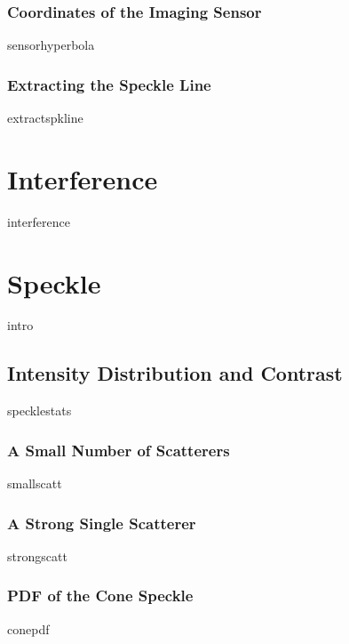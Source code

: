 \documentclass[12pt,a4paper,titlepage,onecolumn]{report}
\begin{document}
\subsection{Coordinates of the Imaging Sensor}
{sensorhyperbola}
\subsection{Extracting the Speckle Line}
{extractspkline}

\chapter{Interference}\label{ch:interference}
{interference}

\chapter{Speckle}\label{ch:speckle}
{intro}
\section{Intensity Distribution and Contrast}
{specklestats}
\subsection{A Small Number of Scatterers}
{smallscatt}
\subsection{A Strong Single Scatterer}
{strongscatt}
\subsection{PDF of the Cone Speckle}
{conepdf}
\end{document}
